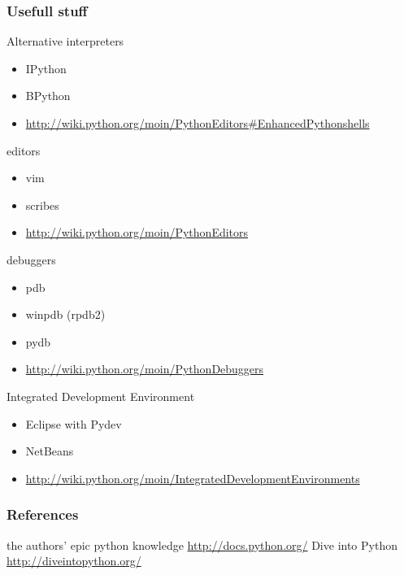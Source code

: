 \documentclass{beamer}
\begin{document}
\begin{frame}[allowframebreaks]
	\frametitle{Usefull stuff}
	
	\begin{block}{Alternative interpreters}
	\begin{itemize}
		\item IPython
		\item BPython
		\item \url{http://wiki.python.org/moin/PythonEditors\#EnhancedPythonshells}
	\end{itemize}
	\end{block}

	\begin{block}{editors}
	\begin{itemize}
		\item vim
		\item scribes
		\item \url{http://wiki.python.org/moin/PythonEditors}
	\end{itemize}
	\end{block}

\framebreak

	\begin{block}{debuggers}
	\begin{itemize}
		\item pdb
		\item winpdb (rpdb2)
		\item pydb
		\item \url{http://wiki.python.org/moin/PythonDebuggers}
	\end{itemize}
	\end{block}
	
	\begin{block}{Integrated Development Environment}
	\begin{itemize}
		\item Eclipse with Pydev
		\item NetBeans
		\item \url{http://wiki.python.org/moin/IntegratedDevelopmentEnvironments}
	\end{itemize}
	\end{block}
\end{frame}

\begin{frame}
	\frametitle{References}
	\begin{thebibliography}{3}
	 the authors' epic python knowledge
	 \url{http://docs.python.org/}
	 Dive into Python \url{http://diveintopython.org/}
	\end{thebibliography}
\end{frame}
\end{document}
